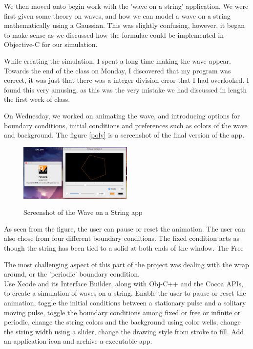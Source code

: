 \documentclass{article}
\begin{document}
 
 
 We then moved onto begin work with the 'wave on a string' application. We were first given some theory on waves, and how we can model a wave on a string mathematically using a Gaussian. This was slightly confusing, however, it began to make sense as we discussed how the formulae could be implemented in Objective-C for our simulation.  
 
 While creating the simulation, I spent a long time making the wave appear. Towards the end of the class on Monday, I discovered that my program was correct, it was just that there was a integer division error that I had overlooked. I found this very amusing, as this was the very mistake we had discussed in length the first week of class.
 
 On Wednesday, we worked on animating the wave, and introducing options for boundary conditions, initial conditions and preferences such as colors of the wave and background. The figure \ref{poly} is a screenshot of the final version of the app. 
 
 
 
 \begin{figure}[h]
 	\caption{Screenshot of the Wave on a String app}
 	\centering
 	\includegraphics[width=0.5\textwidth]{poly} \label{wave}
 \end{figure}
 
 As seen from the figure, the user can pause or reset the animation. The user can also chose from four different boundary conditions. The fixed condition acts as though the string has been tied to a solid at both ends of the window. The Free 
 
 The most challenging aspect of this part of the project was dealing with the wrap around, or the 'periodic' boundary condition.\\  
 Use Xcode and its Interface Builder, along with Obj-C++ and the Cocoa APIs, to create a simulation of waves on a string. Enable the user to pause or reset the animation, toggle the initial conditions between a stationary pulse and a solitary moving pulse, toggle the boundary conditions among fixed or free or infinite or periodic, change the string colors and the background using color wells, change the string width using a slider, change the drawing style from stroke to fill. Add an application icon and archive a executable app.
 
 
\end{document}
